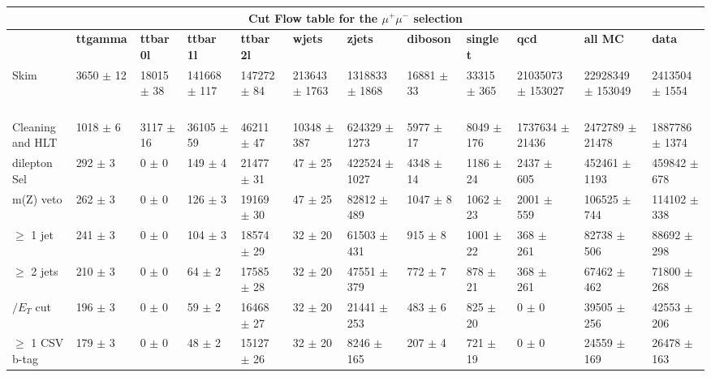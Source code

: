 \begin{table}
  \centering 
\resizebox{\columnwidth}{!} {

\begin{tabular}{|l|l|l|l|l|l|l|l|l|l|l|l|}
\hline
\multicolumn{12}{|c|}{\textbf{Cut Flow table for the $\mu^+\mu^-$ selection}} \\
\hline
& \textbf{ttgamma} & \textbf{ttbar 0l} & \textbf{ttbar 1l} & \textbf{ttbar 2l} & \textbf{wjets} & \textbf{zjets} & \textbf{diboson} & \textbf{single t} & \textbf{qcd} & \textbf{all MC} & \textbf{data} \\
\hline
Skim & 3650 $\pm$ 12 \ & 18015 $\pm$ 38 \ & 141668 $\pm$ 117 \ & 147272 $\pm$ 84 \ & 213643 $\pm$ 1763 \ & 1318833 $\pm$ 1868 \ & 16881 $\pm$ 33 \ & 33315 $\pm$ 365 \ & 21035073 $\pm$ 153027\ & 22928349 $\pm$ 153049 \ & 2413504 $\pm$ 1554 \\
Cleaning and HLT & 1018 $\pm$ 6 \ & 3117 $\pm$ 16 \ & 36105 $\pm$ 59 \ & 46211 $\pm$ 47 \ & 10348 $\pm$ 387 \ & 624329 $\pm$ 1273 \ & 5977 $\pm$ 17 \ & 8049 $\pm$ 176 \ & 1737634 $\pm$ 21436\ & 2472789 $\pm$ 21478 \ & 1887786 $\pm$ 1374 \\
dilepton Sel & 292 $\pm$ 3 \ & 0 $\pm$ 0 \ & 149 $\pm$ 4 \ & 21477 $\pm$ 31 \ & 47 $\pm$ 25 \ & 422524 $\pm$ 1027 \ & 4348 $\pm$ 14 \ & 1186 $\pm$ 24 \ & 2437 $\pm$ 605\ & 452461 $\pm$ 1193 \ & 459842 $\pm$ 678 \\
m(Z) veto & 262 $\pm$ 3 \ & 0 $\pm$ 0 \ & 126 $\pm$ 3 \ & 19169 $\pm$ 30 \ & 47 $\pm$ 25 \ & 82812 $\pm$ 489 \ & 1047 $\pm$ 8 \ & 1062 $\pm$ 23 \ & 2001 $\pm$ 559\ & 106525 $\pm$ 744 \ & 114102 $\pm$ 338 \\
$\geq$ 1 jet & 241 $\pm$ 3 \ & 0 $\pm$ 0 \ & 104 $\pm$ 3 \ & 18574 $\pm$ 29 \ & 32 $\pm$ 20 \ & 61503 $\pm$ 431 \ & 915 $\pm$ 8 \ & 1001 $\pm$ 22 \ & 368 $\pm$ 261\ & 82738 $\pm$ 506 \ & 88692 $\pm$ 298 \\
$\geq$ 2 jets & 210 $\pm$ 3 \ & 0 $\pm$ 0 \ & 64 $\pm$ 2 \ & 17585 $\pm$ 28 \ & 32 $\pm$ 20 \ & 47551 $\pm$ 379 \ & 772 $\pm$ 7 \ & 878 $\pm$ 21 \ & 368 $\pm$ 261\ & 67462 $\pm$ 462 \ & 71800 $\pm$ 268 \\
$\slash{E_{T}}$ cut & 196 $\pm$ 3 \ & 0 $\pm$ 0 \ & 59 $\pm$ 2 \ & 16468 $\pm$ 27 \ & 32 $\pm$ 20 \ & 21441 $\pm$ 253 \ & 483 $\pm$ 6 \ & 825 $\pm$ 20 \ & 0 $\pm$ 0\ & 39505 $\pm$ 256 \ & 42553 $\pm$ 206 \\
$\geq$ 1 CSV b-tag & 179 $\pm$ 3 \ & 0 $\pm$ 0 \ & 48 $\pm$ 2 \ & 15127 $\pm$ 26 \ & 32 $\pm$ 20 \ & 8246 $\pm$ 165 \ & 207 $\pm$ 4 \ & 721 $\pm$ 19 \ & 0 $\pm$ 0\ & 24559 $\pm$ 169 \ & 26478 $\pm$ 163 \\

\end{tabular}}
\end{table}
